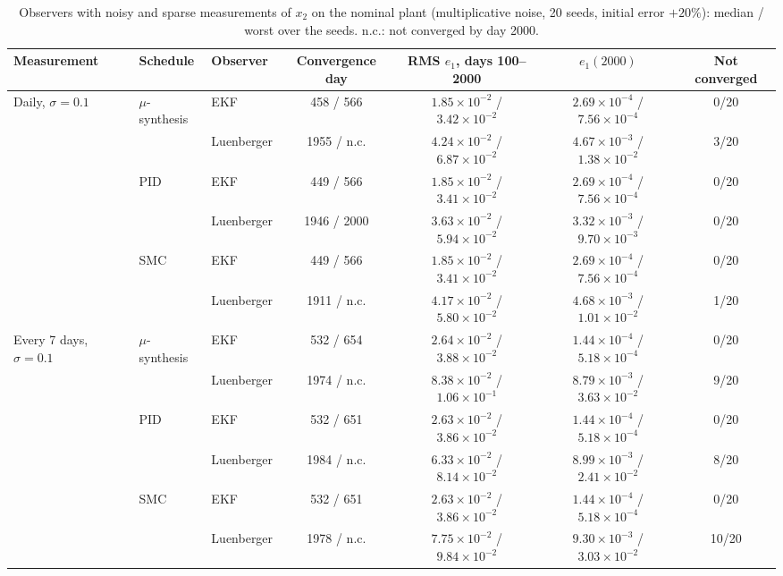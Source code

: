 \begin{table}[htbp]
\centering
\caption{Observers with noisy and sparse measurements of $x_2$ on the nominal plant (multiplicative noise, 20 seeds, initial error $+20\%$): median / worst over the seeds. n.c.: not converged by day 2000.}
\label{tab:observer_noise}
\small
\begin{tabular}{lllcccc}
\toprule
Measurement & Schedule & Observer & Convergence day & RMS $e_1$, days 100--2000 & $e_1(2000)$ & Not converged \\
\midrule
Daily, $\sigma=0.1$ & $\mu$-synthesis & EKF & 458 / 566 & $1.85{\times}10^{-2}$ / $3.42{\times}10^{-2}$ & $2.69{\times}10^{-4}$ / $7.56{\times}10^{-4}$ & 0/20 \\
 &  & Luenberger & 1955 / n.c. & $4.24{\times}10^{-2}$ / $6.87{\times}10^{-2}$ & $4.67{\times}10^{-3}$ / $1.38{\times}10^{-2}$ & 3/20 \\
 & PID & EKF & 449 / 566 & $1.85{\times}10^{-2}$ / $3.41{\times}10^{-2}$ & $2.69{\times}10^{-4}$ / $7.56{\times}10^{-4}$ & 0/20 \\
 &  & Luenberger & 1946 / 2000 & $3.63{\times}10^{-2}$ / $5.94{\times}10^{-2}$ & $3.32{\times}10^{-3}$ / $9.70{\times}10^{-3}$ & 0/20 \\
 & SMC & EKF & 449 / 566 & $1.85{\times}10^{-2}$ / $3.41{\times}10^{-2}$ & $2.69{\times}10^{-4}$ / $7.56{\times}10^{-4}$ & 0/20 \\
 &  & Luenberger & 1911 / n.c. & $4.17{\times}10^{-2}$ / $5.80{\times}10^{-2}$ & $4.68{\times}10^{-3}$ / $1.01{\times}10^{-2}$ & 1/20 \\
\addlinespace
Every 7 days, $\sigma=0.1$ & $\mu$-synthesis & EKF & 532 / 654 & $2.64{\times}10^{-2}$ / $3.88{\times}10^{-2}$ & $1.44{\times}10^{-4}$ / $5.18{\times}10^{-4}$ & 0/20 \\
 &  & Luenberger & 1974 / n.c. & $8.38{\times}10^{-2}$ / $1.06{\times}10^{-1}$ & $8.79{\times}10^{-3}$ / $3.63{\times}10^{-2}$ & 9/20 \\
 & PID & EKF & 532 / 651 & $2.63{\times}10^{-2}$ / $3.86{\times}10^{-2}$ & $1.44{\times}10^{-4}$ / $5.18{\times}10^{-4}$ & 0/20 \\
 &  & Luenberger & 1984 / n.c. & $6.33{\times}10^{-2}$ / $8.14{\times}10^{-2}$ & $8.99{\times}10^{-3}$ / $2.41{\times}10^{-2}$ & 8/20 \\
 & SMC & EKF & 532 / 651 & $2.63{\times}10^{-2}$ / $3.86{\times}10^{-2}$ & $1.44{\times}10^{-4}$ / $5.18{\times}10^{-4}$ & 0/20 \\
 &  & Luenberger & 1978 / n.c. & $7.75{\times}10^{-2}$ / $9.84{\times}10^{-2}$ & $9.30{\times}10^{-3}$ / $3.03{\times}10^{-2}$ & 10/20 \\

\end{tabular}
\end{table}
